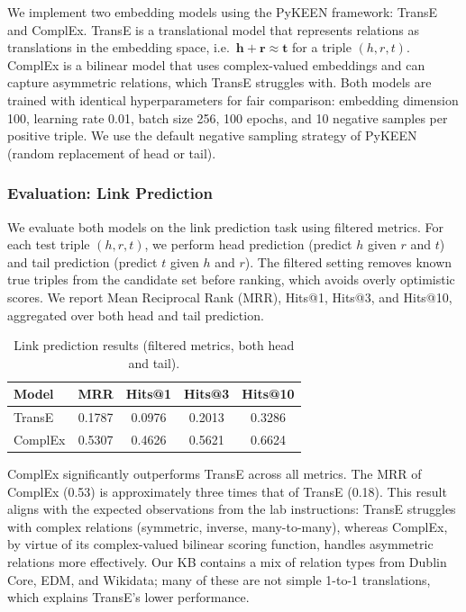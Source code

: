 \documentclass[11pt,a4paper]{article}
\begin{document}
  We implement two embedding models using the PyKEEN framework: TransE and ComplEx. TransE is a translational model that represents relations as translations in the embedding space, i.e.\ $\mathbf{h} + \mathbf{r} \approx \mathbf{t}$ for a triple $(h, r, t)$. ComplEx is a bilinear model that uses complex-valued embeddings and can capture asymmetric relations, which TransE struggles with. Both models are trained with identical hyperparameters for fair comparison: embedding dimension 100, learning rate 0.01, batch size 256, 100 epochs, and 10 negative samples per positive triple. We use the default negative sampling strategy of PyKEEN (random replacement of head or tail).

  \subsubsection{Evaluation: Link Prediction}

  We evaluate both models on the link prediction task using filtered metrics. For each test triple $(h, r, t)$, we perform head prediction (predict $h$ given $r$ and $t$) and tail prediction (predict $t$ given $h$ and $r$). The filtered setting removes known true triples from the candidate set before ranking, which avoids overly optimistic scores. We report Mean Reciprocal Rank (MRR), Hits@1, Hits@3, and Hits@10, aggregated over both head and tail prediction.

  \begin{table}[ht]
  \centering
  \caption{Link prediction results (filtered metrics, both head and tail).}
  \begin{tabular}{lcccc}
  \toprule
  \textbf{Model} & \textbf{MRR} & \textbf{Hits@1} & \textbf{Hits@3} & \textbf{Hits@10} \\
  \midrule
  TransE  & 0.1787 & 0.0976 & 0.2013 & 0.3286 \\
  ComplEx & 0.5307 & 0.4626 & 0.5621 & 0.6624 \\
  \bottomrule
  \end{tabular}
  \end{table}

  ComplEx significantly outperforms TransE across all metrics. The MRR of ComplEx (0.53) is approximately three times that of TransE (0.18). This result aligns with the expected observations from the lab instructions: TransE struggles with complex relations (symmetric, inverse, many-to-many), whereas ComplEx, by virtue of its complex-valued bilinear scoring function, handles asymmetric relations more effectively. Our KB contains a mix of relation types from Dublin Core, EDM, and Wikidata; many of these are not simple 1-to-1 translations, which explains TransE's lower performance.
\end{document}

